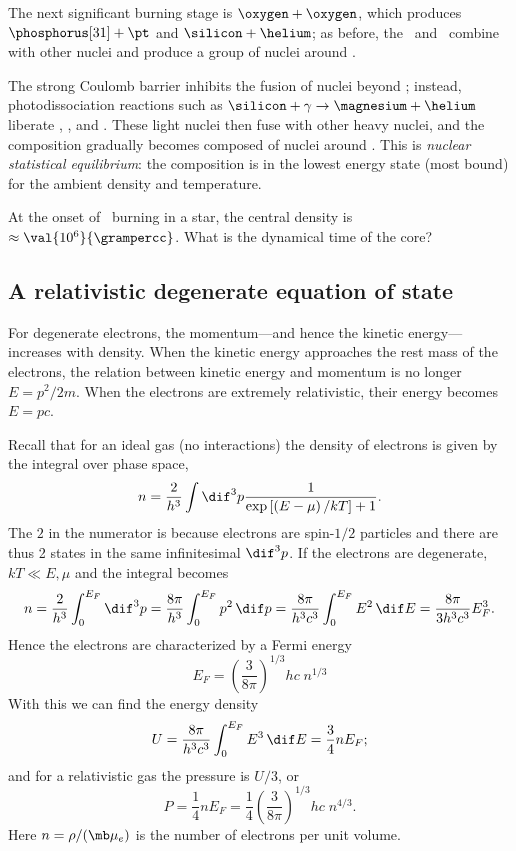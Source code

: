 The next significant burning stage is $\oxygen+\oxygen$, which produces $\phosphorus[31]+\pt$ and $\silicon+\helium$; as before, the \pt\ and \helium\ combine with other nuclei and produce a group of nuclei around \silicon.

The strong Coulomb barrier inhibits the fusion of nuclei beyond \oxygen; instead, photodissociation reactions such as $\silicon+\gamma \to \magnesium+\helium$ liberate \nt, \pt, and \helium.  These light nuclei then fuse with other heavy nuclei, and the composition gradually becomes composed of nuclei around \iron.  This is \emph{nuclear statistical equilibrium}: the composition is in the lowest energy state (most bound) for the ambient density and temperature.

\begin{exercisebox}
At the onset of \oxygen\ burning in a  star, the central density is $\approx \val{10^{6}}{\grampercc}$.  What is the dynamical time of the core?
\end{exercisebox}

\subsection{A relativistic degenerate equation of state}

For degenerate electrons, the momentum---and hence the kinetic energy---increases with density.  When the kinetic energy approaches the rest mass of the electrons, the relation between kinetic energy and momentum is no longer $E = p^{2}/2m$.  When the electrons are extremely relativistic, their energy becomes $E = p c$.

Recall that for an ideal gas (no interactions) the density of electrons is given by the integral over phase space,
\[
  n = \frac{2}{h^{3}} \int \dif^{3}p \frac{1}{\exp\left[\left(E-\mu\right)/kT\right]+1}.
\]
The $2$ in the numerator is because electrons are spin-$1/2$ particles and there are thus 2 states in the same infinitesimal $\dif^{3}p$.  If the electrons are degenerate, $kT \ll E,\mu$ and the integral becomes
\[
  n = \frac{2}{h^{3}}\int_{0}^{E_{F}} \dif^{3}p = \frac{8\pi}{h^{3}} \int_{0}^{E_{F}} p^{2}\,\dif p = \frac{8\pi}{h^{3}c^{3}} \int_{0}^{E_{F}} E^{2}\,\dif E = \frac{8\pi}{3h^{3}c^{3}} E_{F}^{3}.
\]
Hence the electrons are characterized by a Fermi energy
\begin{equation}\label{e.fermi}
	E_{F} = \left(\frac{3}{8\pi}\right)^{1/3}hc\; n^{1/3}
\end{equation}
With this we can find the energy density
\[
  U = \frac{8\pi}{h^{3}c^{3}}\int_{0}^{E_{F}} E^{3}\,\dif E = \frac{3}{4} n E_{F};
\]
and for a relativistic gas the pressure is $U/3$, or
\begin{equation}\label{e.pressure-relativistic}
  P = \frac{1}{4}n E_{F} = \frac{1}{4}\left(\frac{3}{8\pi}\right)^{1/3}hc\; n^{4/3}.
\end{equation}
Here $n = \rho/(\mb\mu_{e})$ is the number of electrons per unit volume.

